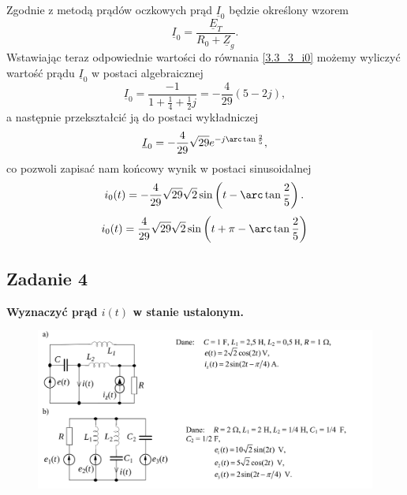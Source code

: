 \documentclass[12pt, a4paper]{article}
\begin{document}
Zgodnie z metodą prądów oczkowych prąd $\underline{I}_0$ będzie określony wzorem
\begin{equation}\label{3.3_3_i0}
  \underline{I}_0 = \frac{\underline{E}_T}{R_0 + \underline{Z}_g}.
\end{equation}
Wstawiając teraz odpowiednie wartości do równania \ref{3.3_3_i0} możemy wyliczyć
wartość prądu $\underline{I}_0$ w postaci algebraicznej
\begin{equation*}
  \underline{I}_0 = \frac{-1}{1 + \frac{1}{4} + \frac{1}{2}j} = -\frac{4}{29}(5-2j),
\end{equation*}
a następnie przekształcić ją do postaci wykładniczej
\begin{equation*}
  \underline{I}_0 = -\frac{4}{29}\sqrt{29}e^{-j\arc \tan \frac{2}{5}},
\end{equation*}
co pozwoli zapisać nam końcowy wynik w postaci sinusoidalnej
\begin{equation*}
  i_0(t) = -\frac{4}{29}\sqrt{29}\sqrt{2}\sin\left(t-\arc\tan\frac{2}{5}\right).
\end{equation*}
\begin{equation*}
  i_0(t) = \frac{4}{29}\sqrt{29}\sqrt{2}\sin\left(t+\pi-\arc\tan\frac{2}{5}\right)
\end{equation*}

\subsection{Zadanie 4}
\textbf{Wyznaczyć prąd $i(t)$ w stanie ustalonym.}
\begin{figure}[H]
  \centering
  \includegraphics[width = \textwidth]{./images/Lista_3/Zadanie_4.png}
\end{figure}
\end{document}
